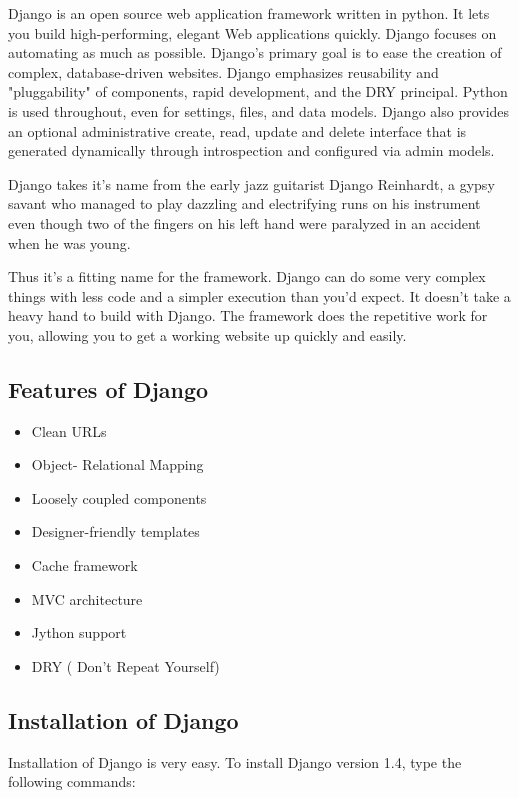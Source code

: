 \begin{center}
\end{center}
\noindent Django is an open source web application framework written in python. It lets 
you build high-performing, elegant Web applications quickly. Django 
focuses on automating as much as possible. Django's primary goal is to 
ease the creation of complex, database-driven websites. Django 
emphasizes reusability and "pluggability" of components, rapid 
development, and the DRY principal. Python is used throughout, even 
for settings, files, and data models. Django also provides an optional
 administrative create, read, update and delete interface that is 
generated dynamically through introspection and configured via admin 
models.

Django takes it's name from the early jazz guitarist Django Reinhardt, 
a gypsy savant who managed to play dazzling and electrifying runs on 
his instrument even though two of the fingers on his left hand were 
paralyzed in an accident when he was young.

Thus it’s a fitting name for the framework. Django can do some very 
complex things with less code and a simpler execution than you’d expect. 
It doesn't take a heavy hand to build with Django. The framework does 
the repetitive work for you, allowing you to get a working website up 
quickly and easily.
\subsection{Features of Django}
\begin{itemize}
\item Clean URLs
\item Object- Relational Mapping
\item Loosely coupled components
\item Designer-friendly templates  
\item Cache framework 
\item MVC architecture
\item Jython support
\item DRY ( Don't Repeat Yourself)
\end{itemize}
\subsection{Installation of Django}
Installation of Django is very easy. To install Django version 1.4,
type the following commands:\\


